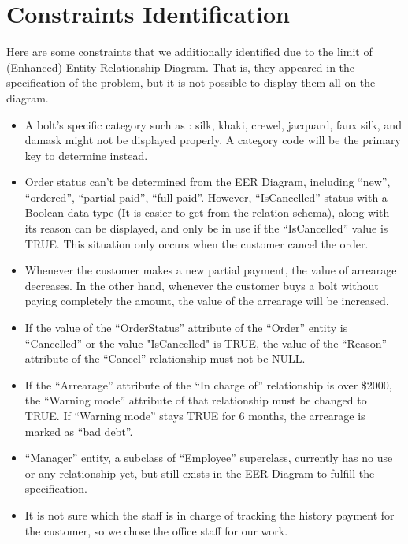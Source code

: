 \documentclass[a4paper]{article}
\begin{document}
\section{Constraints Identification}
Here are some constraints that we additionally identified due to the limit of (Enhanced) Entity-Relationship Diagram. That is, they appeared in the specification of the problem, but it is not possible to display them all on the diagram.
\begin{itemize}
    \item A bolt’s specific category such as : silk, khaki, crewel, jacquard, faux silk, and damask might not be displayed properly. A category code will be the primary key to determine instead.
    \item Order status can’t be determined from the EER Diagram, including “new”, “ordered”, “partial paid”, “full paid”. However, “IsCancelled” status with a Boolean data type (It is easier to get from the relation schema), along with its reason can be displayed, and only be in use if the “IsCancelled” value is TRUE. This situation only occurs when the customer cancel the order.
    \item Whenever the customer makes a new partial payment, the value of arrearage decreases. In the other hand, whenever the customer buys a bolt without paying completely the amount, the value of the arrearage will be increased.
    \item If the value of the “OrderStatus” attribute of the “Order” entity is “Cancelled” or the value "IsCancelled" is TRUE, the value of the “Reason” attribute of the “Cancel” relationship must not be NULL. 
    \item If the “Arrearage” attribute of the “In charge of” relationship is over \$2000, the “Warning mode” attribute of that relationship must be changed to TRUE. If “Warning mode” stays TRUE for 6 months, the arrearage is marked as “bad debt”. 
    \item “Manager” entity, a subclass of “Employee” superclass, currently has no use or any relationship yet, but still exists in the EER Diagram to fulfill the specification.
    \item It is not sure which the staff is in charge of tracking the history payment for the customer, so we chose the office staff for our work.

\end{itemize}


\end{document}
